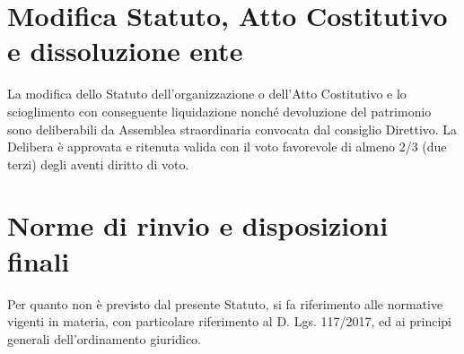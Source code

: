 \documentclass[legalpaper, 11pt]{exam}
\let\tempone\enumerate
\let\temptwo\endenumerate
\renewenvironment{enumerate}{\tempone\addtolength{\itemsep}{-0.45\baselineskip}}{\temptwo}
\begin{document}
{\section{Modifica Statuto, Atto Costitutivo e dissoluzione ente}
\begin{enumerate}
\item La modifica dello Statuto dell’organizzazione o dell’Atto Costitutivo e lo scioglimento con conseguente liquidazione nonché devoluzione del patrimonio sono deliberabili da Assemblea straordinaria convocata dal consiglio Direttivo. La Delibera è approvata e ritenuta valida con il voto favorevole di almeno 2/3 (due terzi) degli aventi diritto di voto.
\end{enumerate}

\section{Norme di rinvio e disposizioni finali}
\begin{enumerate}
 \item Per quanto non è previsto dal presente Statuto, si fa riferimento alle normative vigenti in materia, con particolare riferimento al D. Lgs. 117/2017, ed ai principi generali dell’ordinamento giuridico.
\end{enumerate}
}
\end{document}
